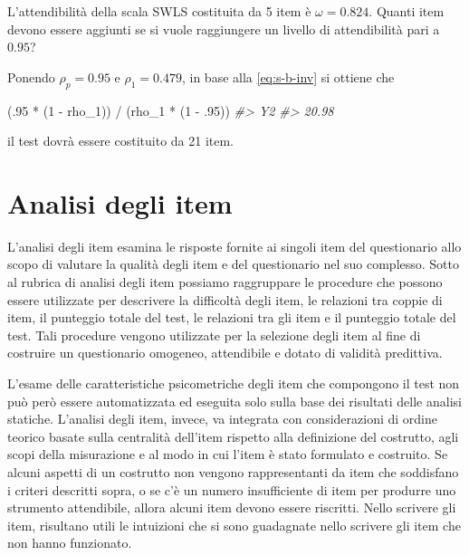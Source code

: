 \documentclass[
  11pt,
]{krantz}
\makeatletter
\newenvironment{Shaded}{\begin{snugshade}}{\end{snugshade}}
\newcommand{\CommentTok}[1]{\textcolor[rgb]{0.37,0.37,0.37}{\textit{#1}}}
\newcommand{\DecValTok}[1]{\textcolor[rgb]{0.06,0.06,0.06}{#1}}
\newcommand{\NormalTok}[1]{#1}
\newcommand{\SpecialCharTok}[1]{\textcolor[rgb]{0,0,0}{#1}}
\newenvironment{kframe}{%
\medskip{}
\setlength{\fboxsep}{.8em}
 \def\at@end@of@kframe{}%
 \ifinner\ifhmode%
  \def\at@end@of@kframe{\end{minipage}}%
  \begin{minipage}{\columnwidth}%
 \fi\fi%
 \def\FrameCommand##1{\hskip\@totalleftmargin \hskip-\fboxsep
 \colorbox{shadecolor}{##1}\hskip-\fboxsep
     \hskip-\linewidth \hskip-\@totalleftmargin \hskip\columnwidth}%
 \MakeFramed {\advance\hsize-\width
   \@totalleftmargin\z@ \linewidth\hsize
   \@setminipage}}%
 {\par\unskip\endMakeFramed%
 \at@end@of@kframe}
\renewenvironment{Shaded}{\begin{kframe}}{\end{kframe}}
\theoremstyle{definition}
\theoremstyle{definition}
\theoremstyle{definition}
\theoremstyle{definition}
\theoremstyle{remark}
\makeatother
\begin{document}
L'attendibilità della scala SWLS costituita da 5 item è \(\omega = 0.824\). Quanti item devono essere aggiunti se si vuole raggiungere un livello di attendibilità pari a \(0.95\)?

Ponendo \(\rho_p = 0.95\) e \(\rho_1= 0.479\), in base alla \eqref{eq:s-b-inv} si ottiene che

\begin{Shaded}
\begin{Highlighting}[]
\NormalTok{(.}\DecValTok{95} \SpecialCharTok{*}\NormalTok{ (}\DecValTok{1} \SpecialCharTok{{-}}\NormalTok{ rho\_1)) }\SpecialCharTok{/}\NormalTok{ (rho\_1 }\SpecialCharTok{*}\NormalTok{ (}\DecValTok{1} \SpecialCharTok{{-}}\NormalTok{ .}\DecValTok{95}\NormalTok{))}
\CommentTok{\#\textgreater{}    Y2 }
\CommentTok{\#\textgreater{} 20.98}
\end{Highlighting}
\end{Shaded}

il test dovrà essere costituito da 21 item.

\hypertarget{analisi-degli-item}{%
\section{Analisi degli item}\label{analisi-degli-item}}

L'analisi degli item esamina le risposte fornite ai singoli item del questionario allo scopo di valutare la qualità degli item e del questionario nel suo complesso. Sotto al rubrica di analisi degli item possiamo raggruppare le procedure che possono essere utilizzate per descrivere la difficoltà degli item, le relazioni tra coppie di item, il punteggio totale del test, le relazioni tra gli item e il punteggio totale del test. Tali procedure vengono utilizzate per la selezione degli item al fine di costruire un questionario omogeneo, attendibile e dotato di validità predittiva.

L'esame delle caratteristiche psicometriche degli item che compongono il test non può però essere automatizzata ed eseguita solo sulla base dei risultati delle analisi statiche. L'analisi degli item, invece, va integrata con considerazioni di ordine teorico basate sulla centralità dell'item rispetto alla definizione del costrutto, agli scopi della misurazione e al modo in cui l'item è stato formulato e costruito. Se alcuni aspetti di un costrutto non vengono rappresentanti da item che soddisfano i criteri descritti sopra, o se c'è un numero insufficiente di item per produrre uno strumento attendibile, allora alcuni item devono essere riscritti. Nello scrivere gli item, risultano utili le intuizioni che si sono guadagnate nello scrivere gli item che non hanno funzionato.
\end{document}
